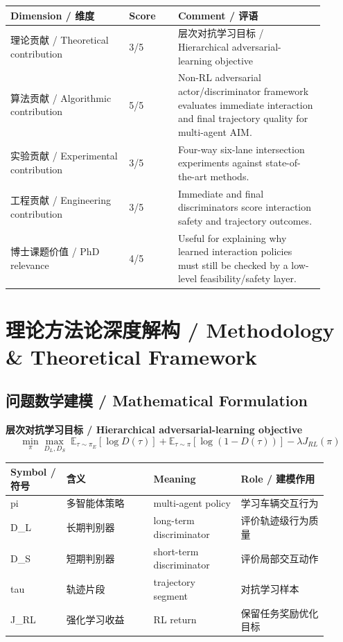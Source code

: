 \documentclass[UTF8,a4paper,11pt,fontset=fandol]{ctexart}
\begin{document}
\begin{longtable}{p{0.34\linewidth}p{0.14\linewidth}p{0.42\linewidth}}
\toprule
Dimension / 维度 & Score & Comment / 评语\\
\midrule
理论贡献 / Theoretical contribution & 3/5 & 层次对抗学习目标 / Hierarchical adversarial-learning objective \\
算法贡献 / Algorithmic contribution & 5/5 & Non-RL adversarial actor/discriminator framework evaluates immediate interaction and final trajectory quality for multi-agent AIM. \\
实验贡献 / Experimental contribution & 3/5 & Four-way six-lane intersection experiments against state-of-the-art methods. \\
工程贡献 / Engineering contribution & 3/5 & Immediate and final discriminators score interaction safety and trajectory outcomes. \\
博士课题价值 / PhD relevance & 4/5 & Useful for explaining why learned interaction policies must still be checked by a low-level feasibility/safety layer. \\
\bottomrule
\end{longtable}

\section{理论方法论深度解构 / Methodology \& Theoretical Framework}
\subsection{问题数学建模 / Mathematical Formulation}
\textbf{层次对抗学习目标 / Hierarchical adversarial-learning objective}
\[
\min_{\pi}\max_{D_L,D_S}\; \mathbb{E}_{\tau\sim\pi_E}[\log D(\tau)]+\mathbb{E}_{\tau\sim\pi}[\log(1-D(\tau))]-\lambda J_{RL}(\pi)
\]
\begin{longtable}{p{0.16\linewidth}p{0.25\linewidth}p{0.25\linewidth}p{0.25\linewidth}}
\toprule
Symbol / 符号 & 含义 & Meaning & Role / 建模作用\\
\midrule
pi & 多智能体策略 & multi-agent policy & 学习车辆交互行为 \\
D\_L & 长期判别器 & long-term discriminator & 评价轨迹级行为质量 \\
D\_S & 短期判别器 & short-term discriminator & 评价局部交互动作 \\
tau & 轨迹片段 & trajectory segment & 对抗学习样本 \\
J\_RL & 强化学习收益 & RL return & 保留任务奖励优化目标 \\
\bottomrule
\end{longtable}
\end{document}

